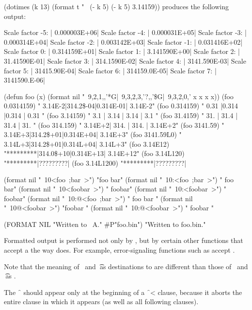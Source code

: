 \code
 (dotimes (k 13)
   (format t "~%
           (- k 5) (- k 5) 3.14159))
\endcode
produces the following output:

\code
Scale factor -5: | 0.000003E+06|
Scale factor -4: | 0.000031E+05|
Scale factor -3: | 0.000314E+04|
Scale factor -2: | 0.003142E+03|
Scale factor -1: | 0.031416E+02|
Scale factor  0: | 0.314159E+01|
Scale factor  1: | 3.141590E+00|
Scale factor  2: | 31.41590E-01|
Scale factor  3: | 314.1590E-02|
Scale factor  4: | 3141.590E-03|
Scale factor  5: | 31415.90E-04|
Scale factor  6: | 314159.0E-05|
Scale factor  7: | 3141590.E-06|
\endcode

\code
 (defun foo (x)
   (format nil "~9,2,1,,'*G|~9,3,2,3,'?,,'\$G|~9,3,2,0,'%
          x x x x))                                     
 (foo 0.0314159) \EV "  3.14E-2|314.2\$-04|0.314E-01|  3.14E-2"
 (foo 0.314159)  \EV "  0.31   |0.314    |0.314    | 0.31    "
 (foo 3.14159)   \EV "   3.1   | 3.14    | 3.14    |  3.1    "
 (foo 31.4159)   \EV "   31.   | 31.4    | 31.4    |  31.    "
 (foo 314.159)   \EV "  3.14E+2| 314.    | 314.    |  3.14E+2"
 (foo 3141.59)   \EV "  3.14E+3|314.2\$+01|0.314E+04|  3.14E+3"
 (foo 3141.59L0) \EV "  3.14L+3|314.2\$+01|0.314L+04|  3.14L+3"
 (foo 3.14E12)   \EV "*********|314.0\$+10|0.314E+13| 3.14E+12"
 (foo 3.14L120)  \EV "*********|?????????|%
 (foo 3.14L1200) \EV "*********|?????????|%
\endcode

\code
 (format nil "~10<foo~;bar~>")   \EV "foo    bar"
 (format nil "~10:<foo~;bar~>")  \EV "  foo  bar"
 (format nil "~10<foobar~>")     \EV "    foobar"
 (format nil "~10:<foobar~>")    \EV "    foobar"
 (format nil "~10:@<foo~;bar~>") \EV "  foo bar "
 (format nil "~10@<foobar~>")    \EV "foobar    "
 (format nil "~10:@<foobar~>")   \EV "  foobar  "
\endcode

\code
  (FORMAT NIL "Written to ~A." #P"foo.bin")
  \EV "Written to foo.bin."
\endcode
{}

\endsubsection%


Formatted output is performed not only by ,
but by certain other functions that accept a 
the way  does.  For example, error-signaling functions
such as  accept .

Note that the meaning of \nil\ and \t\ as destinations to  
are different than those of \nil\ and \t\ as .

The \f{~{\hat}} should appear only at the beginning of a \f{~<} clause,
because it aborts the entire clause in which it appears (as well as
all following clauses).                                     

\endsubsection%
